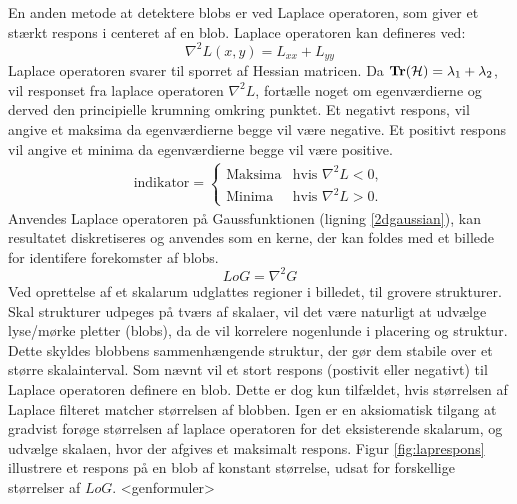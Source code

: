        \vspace{-2.7em}
\noindent
En anden metode at detektere blobs er ved Laplace operatoren, som giver et stærkt respons i centeret af en blob. Laplace operatoren kan defineres ved:
$$
\nabla^2L(x,y) = L_{xx}+L_{yy}
$$
Laplace operatoren svarer til sporret af Hessian matricen. Da $\bold{Tr}(\mathcal{H}) = \lambda_1 + \lambda_2$, vil responset fra laplace operatoren $\nabla^2L$, fortælle noget om egenværdierne og derved den principielle krumning omkring punktet. Et negativt respons, vil angive et maksima da egenværdierne begge vil være negative. Et positivt respons vil angive et minima da egenværdierne begge vil være positive.
\begin{equation}
\begin{split}
\text{indikator} = 
\begin{cases}
\text{Maksima}& \text{hvis } \nabla^2L < 0,  \\
\text{Minima} & \text{hvis } \nabla^2L > 0.
\end{cases}
\end{split}
\label{laplaceblob}
\end{equation}
Anvendes Laplace operatoren på Gaussfunktionen (ligning \eqref{2dgaussian}), kan resultatet diskretiseres og anvendes som en kerne, der kan foldes med et billede for identifere forekomster af blobs.
\begin{equation}
LoG= \nabla^2 G
\label{lap}
\end{equation}
Ved oprettelse af et skalarum udglattes regioner i billedet, til grovere strukturer. 
Skal strukturer udpeges på tværs af skalaer, vil det være naturligt at udvælge lyse/mørke pletter (blobs), da de vil korrelere nogenlunde i placering og struktur. Dette skyldes blobbens sammenhængende struktur, der gør dem stabile over et større skalainterval. Som nævnt vil et stort respons (postivit eller negativt) til Laplace operatoren definere en blob. Dette er dog kun tilfældet, hvis størrelsen af Laplace filteret matcher størrelsen af blobben. Igen er en aksiomatisk tilgang at gradvist forøge størrelsen af laplace operatoren for det eksisterende skalarum, og udvælge skalaen, hvor der afgives et maksimalt respons. Figur \ref{fig:laprespons} illustrere et respons på en blob af konstant størrelse, udsat for forskellige størrelser af $LoG$. <genformuler>

